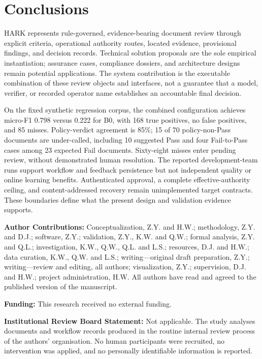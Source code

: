 \documentclass[computers,article,submit,moreauthors]{Definitions/mdpi}
\begin{document}
\section{Conclusions}

HARK represents rule-governed, evidence-bearing document review through explicit criteria, operational authority routes, located evidence, provisional findings, and decision records. Technical solution proposals are the sole empirical instantiation; assurance cases, compliance dossiers, and architecture designs remain potential applications. The system contribution is the executable combination of these review objects and interfaces, not a guarantee that a model, verifier, or recorded operator name establishes an accountable final decision.

On the fixed synthetic regression corpus, the combined configuration achieves micro-F1 0.798 versus 0.222 for B0, with 168 true positives, no false positives, and 85 misses. Policy-verdict agreement is 85\%; 15 of 70 policy-non-Pass documents are under-called, including 10 suggested Pass and four Fail-to-Pass cases among 23 expected Fail documents. Sixty-eight misses enter pending review, without demonstrated human resolution. The reported development-team runs support workflow and feedback persistence but not independent quality or online learning benefits. Authenticated approval, a complete effective-authority ceiling, and content-addressed recovery remain unimplemented target contracts. These boundaries define what the present design and validation evidence supports.

\vspace{6pt}

\noindent\textbf{Author Contributions:} Conceptualization, Z.Y. and H.W.; methodology, Z.Y. and D.J.; software, Z.Y.; validation, Z.Y., K.W. and Q.W.; formal analysis, Z.Y. and Q.L.; investigation, K.W., Q.W., Q.L. and L.S.; resources, D.J. and H.W.; data curation, K.W., Q.W. and L.S.; writing---original draft preparation, Z.Y.; writing---review and editing, all authors; visualization, Z.Y.; supervision, D.J. and H.W.; project administration, H.W. All authors have read and agreed to the published version of the manuscript.

\noindent\textbf{Funding:} This research received no external funding.

\noindent\textbf{Institutional Review Board Statement:} Not applicable. The study analyses documents and workflow records produced in the routine internal review process of the authors' organisation. No human participants were recruited, no intervention was applied, and no personally identifiable information is reported.
\end{document}
